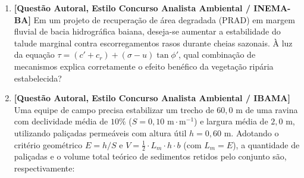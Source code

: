 \begin{enumerate}[leftmargin=1.8em, itemsep=7pt]
  \item \textbf{[Questão Autoral, Estilo Concurso Analista Ambiental / INEMA-BA]} Em um projeto de recuperação de área degradada (PRAD) em margem fluvial de bacia hidrográfica baiana, deseja-se aumentar a estabilidade do talude marginal contra escorregamentos rasos durante cheias sazonais. À luz da equação $\tau = (c' + c_r) + (\sigma - u)\tan\phi'$, qual combinação de mecanismos explica corretamente o efeito benéfico da vegetação ripária estabelecida?

  \item \textbf{[Questão Autoral, Estilo Concurso Analista Ambiental / IBAMA]} Uma equipe de campo precisa estabilizar um trecho de $60{,}0\text{ m}$ de uma ravina com declividade média de $10\%$ ($S = 0{,}10\text{ m}\cdot\text{m}^{-1}$) e largura média de $2{,}0\text{ m}$, utilizando paliçadas permeáveis com altura útil $h = 0{,}60\text{ m}$. Adotando o critério geométrico $E = h/S$ e $V = \frac{1}{2}\cdot L_m \cdot h \cdot b$ (com $L_m = E$), a quantidade de paliçadas e o volume total teórico de sedimentos retidos pelo conjunto são, respectivamente:
\end{enumerate}

